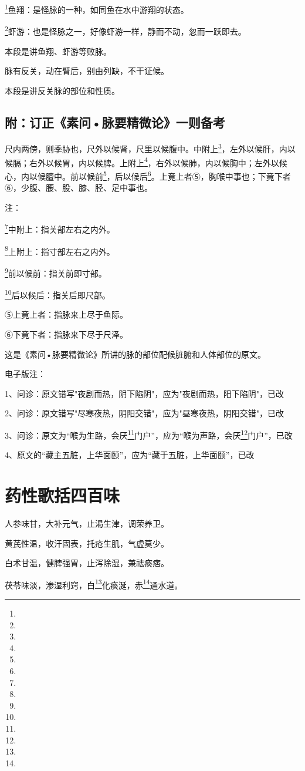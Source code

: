 \documentclass[a4paper,12pt,UTF8,twoside]{ctexbook}
\begin{document}
\footnote{}鱼翔：是怪脉的一种，如同鱼在水中游翔的状态。

\footnote{}虾游：也是怪脉之一，好像虾游一样，静而不动，忽而一跃即去。

本段是讲鱼翔、虾游等败脉。

脉有反关，动在臂后，别由列缺，不干证候。

本段是讲反关脉的部位和性质。

\section{附：订正《素问•脉要精微论》一则备考}

尺内两傍，则季胁也，尺外以候肾，尺里以候腹中。中附上\footnote{}，左外以候肝，内以候膈；右外以候胃，内以候脾。上附上\footnote{}，右外以候肺，内以候胸中；左外以候心，内以候膻中。前以候前\footnote{}，后以候后\footnote{}。上竟上者⑤，胸喉中事也；下竟下者⑥，少腹、腰、股、膝、胫、足中事也。

注：

\footnote{}中附上：指关部左右之内外。

\footnote{}上附上：指寸部左右之内外。

\footnote{}前以候前：指关前即寸部。

\footnote{}后以候后：指关后即尺部。

⑤上竟上者：指脉来上尽于鱼际。

⑥下竟下者：指脉来下尽于尺泽。

这是《素问•脉要精微论》所讲的脉的部位配候脏腑和人体部位的原文。

电子版注：

1、问诊：原文错写"夜剧而热，阴下陷阴"，应为"夜剧而热，阳下陷阴"，已改

2、问诊：原文错写"尽寒夜热，阴阳交错"，应为"昼寒夜热，阴阳交错"，已改

3、问诊：原文为“喉为生路，会厌\footnote{}门户”，应为“喉为声路，会厌\footnote{}门户”，已改

4、原文的“藏主五脏，上华面颐”，应为“藏于五脏，上华面颐”，已改

\chapter{药性歌括四百味}

人参味甘，大补元气，止渴生津，调荣养卫。

黄芪性温，收汗固表，托疮生肌，气虚莫少。

白术甘温，健脾强胃，止泻除湿，兼祛痰痞。

茯苓味淡，渗湿利窍，白\footnote{}化痰涎，赤\footnote{}通水道。
\end{document}
